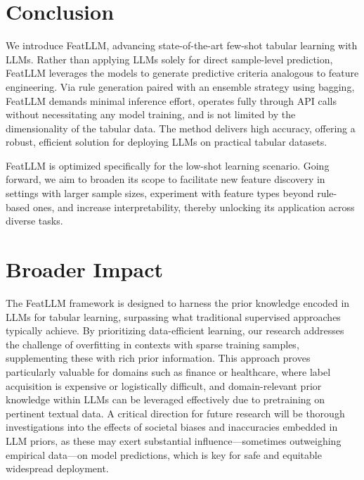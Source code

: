 \section{Conclusion}
We introduce \textsf{FeatLLM}, advancing state-of-the-art few-shot tabular learning with LLMs. Rather than applying LLMs solely for direct sample-level prediction, \textsf{FeatLLM} leverages the models to generate predictive criteria analogous to feature engineering. Via rule generation paired with an ensemble strategy using bagging, \textsf{FeatLLM} demands minimal inference effort, operates fully through API calls without necessitating any model training, and is not limited by the dimensionality of the tabular data. The method delivers high accuracy, offering a robust, efficient solution for deploying LLMs on practical tabular datasets.

\textsf{FeatLLM} is optimized specifically for the low-shot learning scenario. Going forward, we aim to broaden its scope to facilitate new feature discovery in settings with larger sample sizes, experiment with feature types beyond rule-based ones, and increase interpretability, thereby unlocking its application across diverse tasks.

\section{Broader Impact}
The \textsf{FeatLLM} framework is designed to harness the prior knowledge encoded in LLMs for tabular learning, surpassing what traditional supervised approaches typically achieve. By prioritizing data-efficient learning, our research addresses the challenge of overfitting in contexts with sparse training samples, supplementing these with rich prior information. This approach proves particularly valuable for domains such as finance or healthcare, where label acquisition is expensive or logistically difficult, and domain-relevant prior knowledge within LLMs can be leveraged effectively due to pretraining on pertinent textual data. A critical direction for future research will be thorough investigations into the effects of societal biases and inaccuracies embedded in LLM priors, as these may exert substantial influence—sometimes outweighing empirical data—on model predictions, which is key for safe and equitable widespread deployment.

